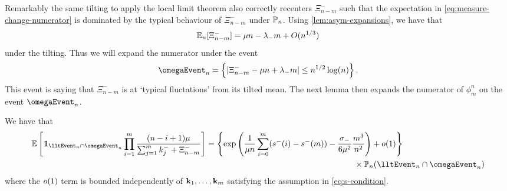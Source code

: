 Remarkably the same tilting to apply the local limit theorem also correctly recenters $\Xi_{n-m}^-$ such that the expectation in \cref{eq:measure-change-numerator} is dominated by the typical behaviour of $\Xi_{n-m}^-$ under $\P_n$. Using \cref{lem:asym-expansions}, we have that
\begin{equation*}
    \E_n[\Xi_{n-m}^-] =  \mu n - \lambda_- m + \bigo(n^{1/3})
\end{equation*}
under the tilting. Thus we will expand the numerator under the event
\begin{equation*}
    \omegaEvent_n = \left\{ 
        \abs{\Xi^-_{n-m} - \mu n + \lambda_- m} \leq n^{1/2} \log(n)
     \right\}.
\end{equation*}
This event is saying that $\Xi_{n-m}^-$ is at `typical fluctations' from its tilted mean. The next lemma then expands the numerator of $\phi^n_m$ on the event $\omegaEvent_n$.
\begin{lemma}
    \label{lem:measure-change-numerator}
    We have that
    \begin{align*}
        \E\left[ 
            \one_{\lltEvent_n \cap \omegaEvent_n}
            \prod_{i=1}^m \frac{(n - i + 1) \mu}{\sum_{j=1}^m k_j^- + \Xi_{n-m}^-}
        \right]
        & =
        \left\{ \exp\left(
            \frac{1}{\mu n} \sum_{i=0}^m (s^-(i) - s^-(m)) - \frac{\sigma_-}{6 \mu^2} \frac{m^3}{n^2}
        \right) + \littleo(1) \right\} \\
        & \hspace{18em} \times \P_n(\lltEvent_n \cap \omegaEvent_n)
    \end{align*}
    where the $\littleo(1)$ term is bounded independently of $\vk_1, \ldots, \vk_m$ satisfying the assumption in \vref{eq:s-condition}.
\end{lemma}
